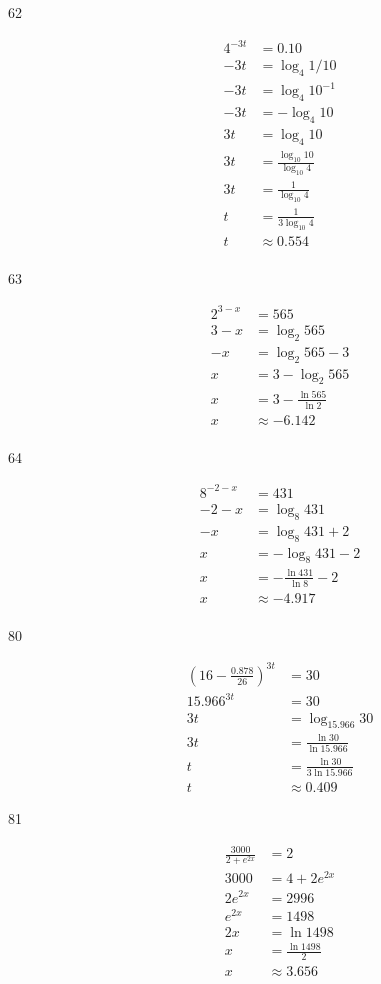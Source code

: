 \documentclass[fleqn,addpoints]{exam}
\begin{document}
\begin{description}
\item[62]
\begin{align*}
  4^{-3t} &= 0.10 \\
  -3t &= \log_4 1/10 \\
  -3t &= \log_4 10^{-1} \\
  -3t &= -\log_4 10 \\
  3t &= \log_4 10 \\
  3t &= \frac{\log_{10} 10}{\log_{10} 4} \\
  3t &= \frac{1}{\log_{10} 4} \\
  t &= \frac{1}{3 \log_{10} 4} \\
  t &\approx 0.554 \\
\end{align*}

\item[63]
\begin{align*}
  2^{3-x} &= 565 \\
  3-x &= \log_2 565 \\
  -x &= \log_2 565 - 3\\
  x &= 3 - \log_2 565 \\
  x &= 3 - \frac{\ln 565}{\ln 2} \\
  x &\approx -6.142 \\
\end{align*}

\item[64]
\begin{align*}
  8^{-2-x} &= 431 \\
  -2-x &= \log_8 431 \\
  -x &= \log_8 431 + 2 \\
  x &= - \log_8 431 - 2 \\
  x &= - \frac{\ln 431}{\ln 8} - 2 \\
  x &\approx -4.917 \\
\end{align*}

\item[80]
\begin{align*}
  \left(16 - \frac{0.878}{26} \right)^{3t} &= 30 \\
  15.966^{3t} &= 30 \\
  3t &= \log_{15.966} 30 \\
  3t &= \frac{\ln 30}{\ln 15.966} \\
  t &= \frac{\ln 30}{3 \ln 15.966} \\
  t &\approx 0.409
\end{align*}

\item[81]
\begin{align*}
  \frac{3000}{2 + e^{2x}} &= 2 \\
  3000 &= 4 + 2e^{2x} \\
  2e^{2x} &= 2996 \\
  e^{2x} &= 1498 \\
  2x &= \ln 1498 \\
  x &= \frac{\ln 1498}{2} \\
  x &\approx 3.656 \\
\end{align*}


\end{description}
\end{document}
